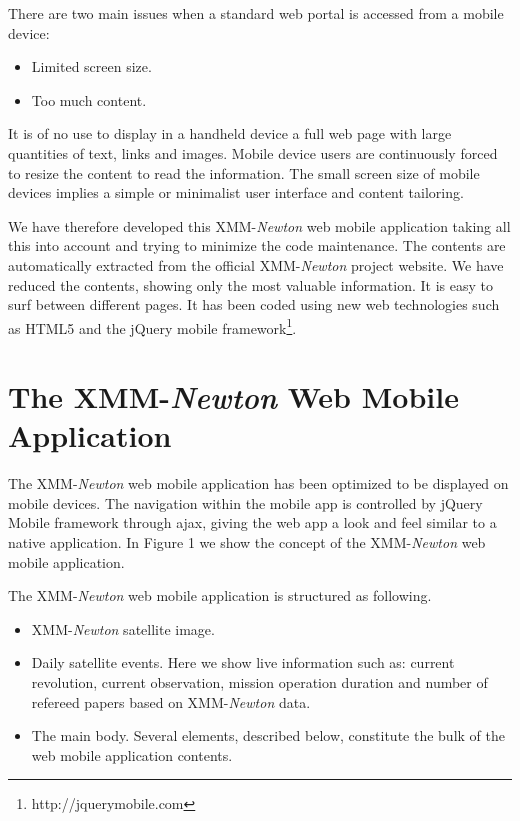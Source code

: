 There are two main issues when a standard web portal is accessed from a mobile device:
\begin{itemize}
\item Limited screen size.
\item Too much content.
\end{itemize}

It is of no use to display in a handheld device a full web page with large quantities of text, links and images. Mobile device users are continuously forced to resize the content to read the information. The small screen size of mobile devices implies a simple or minimalist user interface and content tailoring.

We have therefore developed this XMM-{\em Newton} web mobile application taking all this into account and trying to minimize the code maintenance. The contents are automatically extracted from the official XMM-{\em Newton} project website. We have reduced the contents, showing only the most valuable information. It is easy to surf between different pages. It has been coded using new web technologies such as HTML5 and the jQuery mobile framework\footnote{http://jquerymobile.com}.

\section{The XMM-{\em Newton} Web Mobile Application}

The XMM-{\em Newton} web mobile application has been optimized to be displayed on mobile devices. The navigation within the mobile app is controlled by jQuery Mobile framework through ajax, giving the web app a look and feel similar to a native application. In Figure 1 we show the concept of the XMM-{\em Newton} web mobile application.

The XMM-{\em Newton} web mobile application is structured as following.
\begin{itemize}
\item {}XMM-{\em Newton} satellite image.
\item Daily satellite events. Here we show live information such as: current revolution, current observation, mission operation duration and number of refereed papers based on 
XMM-{\em Newton} data.
\item The main body. Several elements, described below, constitute the bulk of the web mobile application contents.
\end{itemize}

